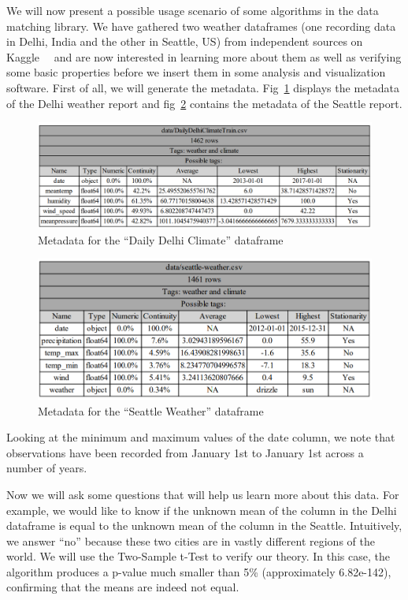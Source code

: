 We will now present a possible usage scenario of some algorithms in the data matching library.
We have gathered two weather dataframes (one recording data in Delhi, India and the other in Seattle, US) from independent
sources on Kaggle~~\cite{kaggleDailyDelhiClimate,kaggleSeattleWeather} and are now interested in learning more about them
as well as verifying some basic properties before we insert them in some analysis and visualization software.
First of all, we will generate the metadata.
Fig~\ref{fig:daily_delhi_climate} displays the metadata of the Delhi weather report and fig~\ref{fig:seattle_weather} contains
the metadata of the Seattle report.

\begin{figure}[H]
    \centering
    \includegraphics[width=12cm]{figures/matching_weather_data/daily_delhi_climate}
    \caption{Metadata for the ``Daily Delhi Climate'' dataframe}
    \label{fig:daily_delhi_climate}
\end{figure}

\begin{figure}[H]
    \centering
    \includegraphics[width=12cm]{figures/matching_weather_data/seattle_weather}
    \caption{Metadata for the ``Seattle Weather'' dataframe}
    \label{fig:seattle_weather}
\end{figure}

Looking at the minimum and maximum values of the date column, we note that observations have been recorded from January 1st
to January 1st across a number of years.

Now we will ask some questions that will help us learn more about this data.
For example, we would like to know if the unknown mean of the column  in the Delhi dataframe is equal to the
unknown mean of the column  in the Seattle.
Intuitively, we answer ``no'' because these two cities are in vastly different regions of the world.
We will use the Two-Sample t-Test to verify our theory.
In this case, the algorithm produces a p-value much smaller than 5\% (approximately 6.82e-142), confirming that the means
are indeed not equal.

